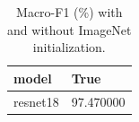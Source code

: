 \begin{table}[t]
\centering
\caption{Macro-F1 (\%) with and without ImageNet initialization.}
\label{tab:ablation_pretrained}
\begin{tabular}{ll}
\toprule
model & True \\
\midrule
resnet18 & 97.470000 \\
\bottomrule
\end{tabular}
\end{table}
